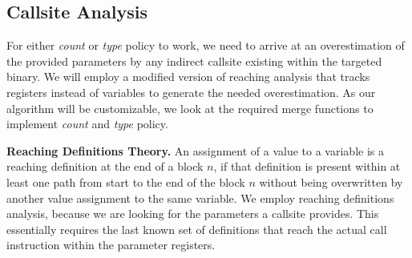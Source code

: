 \subsection{Callsite Analysis}
\label{section:callsiteanalysis}
For either \emph{count} or \emph{type} policy to work, we need to arrive at an overestimation of the provided parameters by any indirect 
callsite existing within the targeted binary. We will employ a modified version of reaching analysis that tracks registers instead of 
variables to generate the needed overestimation. As our algorithm will be customizable, we look at the required merge functions to 
implement \emph{count} and \emph{type} policy. 

\textbf{Reaching Definitions Theory.}
\label{subsection:reachindefinitionstheory}
An assignment of a value to a variable is a reaching definition at the end of a block $n$, if that definition is present within at 
least one path from start to the end of the block $n$ without being overwritten by another value assignment to the same variable. 
We employ reaching definitions analysis, because we are looking for the parameters a callsite provides. This essentially 
requires the last known set of definitions that reach the actual call instruction within the parameter registers.


